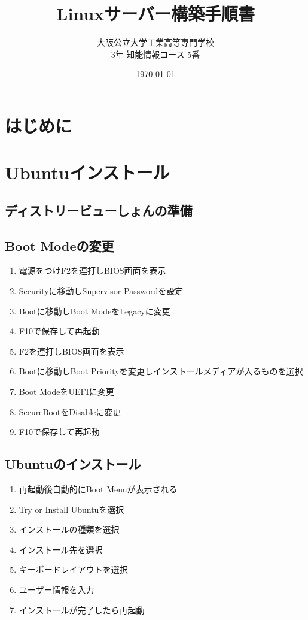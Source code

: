 \documentclass[a4paper, 11pt, dvipdfmx]{jsarticle}
\begin{document}
\title{Linuxサーバー構築手順書}
\author{大阪公立大学工業高等専門学校\\
3年 知能情報コース 5番\\
}
\date{\today}
\maketitle\thispagestyle{empty}

\newpage
\setcounter{section}{-1}

\section{はじめに}

\section{Ubuntuインストール}
\subsection{ディストリービューしょんの準備}
\subsection{Boot Modeの変更}
  \begin{enumerate}
    \item 電源をつけF2を連打しBIOS画面を表示
    \item Securityに移動しSupervisor Passwordを設定
    \item Bootに移動しBoot ModeをLegacyに変更
    \item F10で保存して再起動
    \item F2を連打しBIOS画面を表示
    \item Bootに移動しBoot Priorityを変更しインストールメディアが入るものを選択
    \item Boot ModeをUEFIに変更
    \item SecureBootをDisableに変更
    \item F10で保存して再起動
  \end{enumerate}
\subsection{Ubuntuのインストール}
  \begin{enumerate}
    \item 再起動後自動的にBoot Menuが表示される
    \item Try or Install Ubuntuを選択
    \item インストールの種類を選択
    \item インストール先を選択
    \item キーボードレイアウトを選択
    \item ユーザー情報を入力
    \item インストールが完了したら再起動
  \end{enumerate}
\end{document}
